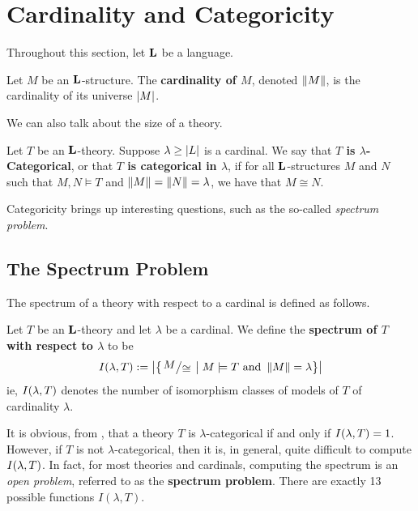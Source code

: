 \section{Cardinality and Categoricity}

Throughout this section, let $\mathbf{L}$ be a language.

\begin{boxdefinition}
    Let $M$ be an $\mathbf{L}$-structure. The \textbf{cardinality of $M$}, denoted $\left\lVert M \right\rVert$, is the cardinality of its universe $\left\lvert M \right\rvert$.
\end{boxdefinition}

We can also talk about the size of a theory.

\begin{boxdefinition}\label{Ch1:Def:Categoricity}
    Let $T$ be an $\mathbf{L}$-theory. Suppose $\lambda \geq \left\lvert L \right\rvert$ is a cardinal. We say that \textbf{$T$ is $\lambda$-Categorical}, or that \textbf{$T$ is categorical in $\lambda$}, if for all $\mathbf{L}$-structures $M$ and $N$ such that $M, N \models T$ and $\left\lVert M \right\rVert = \left\lVert N \right\rVert = \lambda$, we have that $M \cong N$.
\end{boxdefinition}

Categoricity brings up interesting questions, such as the so-called \textit{spectrum problem}.

\subsection{The Spectrum Problem}

The spectrum of a theory with respect to a cardinal is defined as follows.

\begin{boxdefinition}[Spectrum]\label{Ch1:Def:Spectrum}
    Let $T$ be an $\mathbf{L}$-theory and let $\lambda$ be a cardinal. We define the \textbf{spectrum of $T$ with respect to $\lambda$} to be
    \begin{align*}
        I\of{\lambda, T} := \abs{
            \setst{\quotient{M}{\cong}}{M \models T \text{ and } \norm{M} = \lambda}
        }
    \end{align*}
    ie, $I\!\left( \lambda, T \right)$ denotes the number of isomorphism classes of models of $T$ of cardinality $\lambda$.
\end{boxdefinition}

It is obvious, from , that a theory $T$ is $\lambda$-categorical if and only if $I\!\left( \lambda, T \right) = 1$. However, if $T$ is not $\lambda$-categorical, then it is, in general, quite difficult to compute $I\!\left( \lambda, T \right)$. In fact, for most theories and cardinals, computing the spectrum is an \textit{open problem}, referred to as the \textbf{spectrum problem}. There are exactly 13 possible functions $I(\lambda, T)$.

